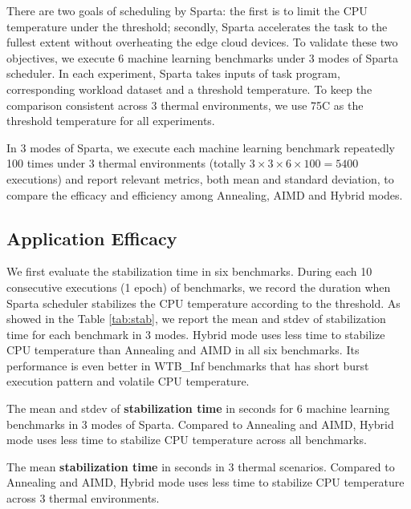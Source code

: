 There are two goals of scheduling by Sparta: the first is to limit the CPU temperature under the threshold; secondly, Sparta accelerates the task to the fullest extent without overheating the edge cloud devices. To validate these two objectives, we execute 6 machine learning benchmarks under 3 modes of Sparta scheduler. In each experiment, Sparta takes inputs of task program, corresponding workload dataset and a threshold temperature. To keep the comparison consistent across 3 thermal environments, we use 75\degree C as the threshold temperature for all experiments.

In 3 modes of Sparta, we execute each machine learning benchmark repeatedly 100 times under 3 thermal environments (totally $3 \times 3 \times 6 \times 100 = 5400$ executions) and report relevant metrics, both mean and standard deviation, to compare the efficacy and efficiency among Annealing, AIMD and Hybrid modes.


\subsection{Application Efficacy}

We first evaluate the stabilization time in six benchmarks. During each 10 consecutive executions (1 epoch) of benchmarks, we record the duration when Sparta scheduler stabilizes the CPU temperature according to the threshold. As showed in the Table \ref{tab:stab}, we report the mean and stdev of stabilization time for each benchmark in 3 modes. Hybrid mode uses less time to stabilize CPU temperature than Annealing and AIMD in all six benchmarks. Its performance is even better in WTB\_Inf benchmarks that has short burst execution pattern and volatile CPU temperature.


\begin{table}[h!]
\caption{The mean and stdev of \textbf{stabilization time} in seconds for 6 machine learning benchmarks in 3 modes of Sparta. Compared to Annealing and AIMD, Hybrid mode uses less time to stabilize CPU temperature across all benchmarks. }\label{tab:stab}
\vspace{1mm}
\centering
\resizebox{350pt}{!}{}
\end{table}


\begin{table}[h!]
\caption{The mean \textbf{stabilization time} in seconds in 3 thermal scenarios. Compared to Annealing and AIMD, Hybrid mode uses less time to stabilize CPU temperature across 3 thermal environments.  }\label{tab:stab_th}
\vspace{1mm}
\centering
\resizebox{350pt}{!}{}
\end{table}

